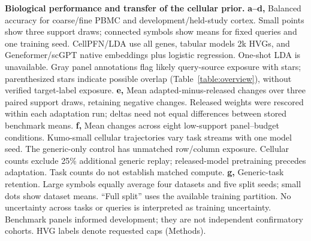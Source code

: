 \textbf{Biological performance and transfer of the cellular prior.}
\textbf{a--d,} Balanced accuracy for coarse/fine PBMC and development/held-study cortex. Small points show three support draws; connected symbols show means for fixed queries and one training seed. CellPFN/LDA use all genes, tabular models 2k HVGs, and Geneformer/scGPT native embeddings plus logistic regression. One-shot LDA is unavailable. Gray panel annotations flag likely query-source exposure with stars; parenthesized stars indicate possible overlap (Table~\ref{table:overview}), without verified target-label exposure.
\textbf{e,} Mean adapted-minus-released changes over three paired support draws, retaining negative changes. Released weights were rescored within each adaptation run; deltas need not equal differences between stored benchmark means.
\textbf{f,} Mean changes across eight low-support panel--budget conditions. Kumo-small cellular trajectories vary task streams with one model seed. The generic-only control has unmatched row/column exposure. Cellular counts exclude 25\% additional generic replay; released-model pretraining precedes adaptation. Task counts do not establish matched compute.
\textbf{g,} Generic-task retention. Large symbols equally average four datasets and five split seeds; small dots show dataset means. ``Full split'' uses the available training partition. No uncertainty across tasks or queries is interpreted as training uncertainty. Benchmark panels informed development; they are not independent confirmatory cohorts. HVG labels denote requested caps (Methods).
